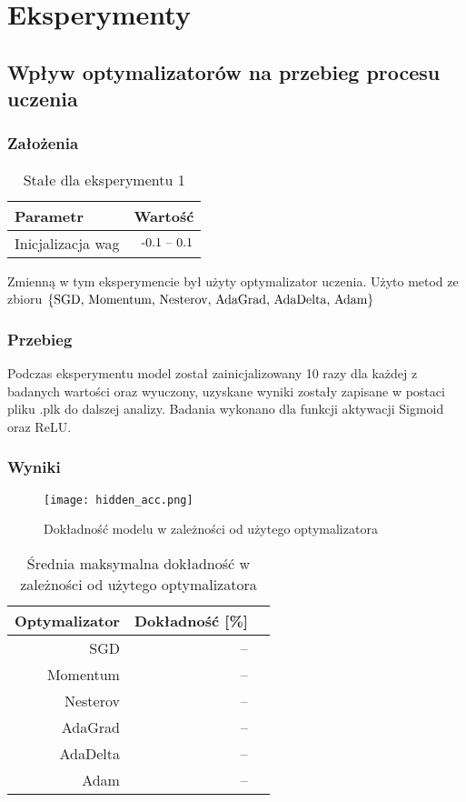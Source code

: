 \documentclass{article}
\begin{document}
\newpage
\section{Eksperymenty}

\subsection{Wpływ optymalizatorów na przebieg procesu uczenia}
\subsubsection*{Założenia}
\begin{table}[H]
	\caption{Stałe dla eksperymentu 1}
	\label{tabela-const-1}
	\centering
	\begin{tabular}{lr}
		\toprule
		Parametr          & Wartość         \\
		\midrule
		Inicjalizacja wag & \($-0.1 -- 0.1$\) \\
		\bottomrule
	\end{tabular}
\end{table}

Zmienną w tym eksperymencie był użyty optymalizator uczenia. Użyto metod ze zbioru \(\{$SGD, Momentum, Nesterov, AdaGrad, AdaDelta, Adam$\}\)
\subsubsection*{Przebieg}

Podczas eksperymentu model został zainicjalizowany 10 razy dla każdej z badanych wartości oraz wyuczony, uzyskane wyniki zostały zapisane w postaci pliku .plk do dalszej analizy. Badania wykonano dla funkcji aktywacji Sigmoid oraz ReLU.

\subsubsection*{Wyniki}
\begin{figure}[H]
	\centering
	\caption{Dokładność modelu w zależności od użytego optymalizatora}
	\texttt{[image: hidden\_acc.png]}
	\label{fig:res11}
\end{figure}

\begin{table}[H]
	\caption{Średnia maksymalna dokładność w zależności od użytego optymalizatora}
	\label{tabela-res-11}
	\centering
	\begin{tabular}{rrr}
		\toprule
		Optymalizator & Dokładność [\%] \\
		\midrule
		SGD           & --                 \\
		Momentum      & --                 \\
		Nesterov      & --                 \\
		AdaGrad       & --                 \\
		AdaDelta      & --                 \\
		Adam          & --                 \\
		\bottomrule
	\end{tabular}
\end{table}
\end{document}
